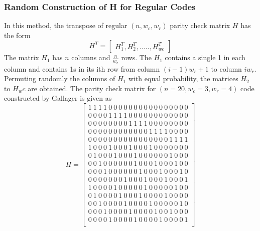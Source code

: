 \subsubsection{Random Construction of H for Regular Codes}
In this method, the transpose of regular $(n, w_c, w_r)$ parity check matrix $H$ has the form
\[H^T =\begin{bmatrix}
H_{1}^T, H_{2}^T, ....., H_{wc}^T    
\end{bmatrix}\]
The matrix $H_1$ has $n$ columns and $\frac{n}{w_r}$ rows. The $H_1$ contains a single 1 in each column and contains 1s in its ith row from column $(i - 1)w_r + 1$ to column $i w_r$. Permuting randomly the columns of $H_1$ with equal probability, the matrices $H_2$ to $H_wc$ are obtained. The parity check matrix for $(n = 20, w_c = 3, w_r = 4)$ code constructed by Gallager is given as
\[H=\left[\begin{matrix}1\ 1\ 1\ 1\ 0\ 0\ 0\ 0\ 0\ 0\ 0\ 0\ 0\ 0\ 0\ 0\ 0\ 0\ 0\ 0\\0\ 0\ 0\ 0\ 1\ 1\ 1\ 1\ 0\ 0\ 0\ 0\ 0\ 0\ 0\ 0\ 0\ 0\ 0\ 0\\0\ 0\ 0\ 0\ 0\ 0\ 0\ 0\ 1\ 1\ 1\ 1\ 0\ 0\ 0\ 0\ 0\ 0\ 0\ 0\\0\ 0\ 0\ 0\ 0\ 0\ 0\ 0\ 0\ 0\ 0\ 0\ 1\ 1\ 1\ 1\ 0\ 0\ 0\ 0\\0\ 0\ 0\ 0\ 0\ 0\ 0\ 0\ 0\ 0\ 0\ 0\ 0\ 0\ 0\ 0\ 1\ 1\ 1\ 1\\1\ 0\ 0\ 0\ 1\ 0\ 0\ 0\ 1\ 0\ 0\ 0\ 1\ 0\ 0\ 0\ 0\ 0\ 0\ 0\\0\ 1\ 0\ 0\ 0\ 1\ 0\ 0\ 0\ 1\ 0\ 0\ 0\ 0\ 0\ 0\ 1\ 0\ 0\ 0\\0\ 0\ 1\ 0\ 0\ 0\ 0\ 0\ 0\ 1\ 0\ 0\ 0\ 1\ 0\ 0\ 0\ 1\ 0\ 0\\0\ 0\ 0\ 1\ 0\ 0\ 0\ 0\ 0\ 0\ 1\ 0\ 0\ 0\ 1\ 0\ 0\ 0\ 1\ 0\\0\ 0\ 0\ 0\ 0\ 0\ 0\ 1\ 0\ 0\ 0\ 1\ 0\ 0\ 0\ 1\ 0\ 0\ 0\ 1\\1\ 0\ 0\ 0\ 0\ 1\ 0\ 0\ 0\ 0\ 0\ 1\ 0\ 0\ 0\ 0\ 0\ 1\ 0\ 0\\0\ 1\ 0\ 0\ 0\ 0\ 1\ 0\ 0\ 0\ 1\ 0\ 0\ 0\ 0\ 1\ 0\ 0\ 0\ 0\\0\ 0\ 1\ 0\ 0\ 0\ 0\ 1\ 0\ 0\ 0\ 0\ 1\ 0\ 0\ 0\ 0\ 0\ 1\ 0\\0\ 0\ 0\ 1\ 0\ 0\ 0\ 0\ 1\ 0\ 0\ 0\ 0\ 1\ 0\ 0\ 1\ 0\ 0\ 0\\0\ 0\ 0\ 0\ 1\ 0\ 0\ 0\ 0\ 1\ 0\ 0\ 0\ 0\ 1\ 0\ 0\ 0\ 0\ 1\\\end{matrix}\right]\]

